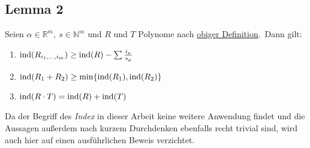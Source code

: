     \subsection{Lemma 2}
        \label{subsec:lemma2}
        Seien $\alpha \in \mathbb{R}^m,\ s \in \mathbb{N}^m$ und $R$ und $T$ Polynome nach \hyperref
        [subsubsec:def-poly]{obiger Definition}.\ Dann gilt:
        \begin{enumerate}
            \item $\operatorname{ind}(R_{i_1, \dots, i_m}) \geq \operatorname{ind}(R) - \sum \frac{i_\mu}{s_\mu}$
            \item $\operatorname{ind}(R_1 + R_2) \geq \min \{ \operatorname{ind}(R_1), \operatorname{ind}(R_2) \}$
            \item $\operatorname{ind}(R \cdot T) = \operatorname{ind}(R) +\operatorname{ind}(T)$
        \end{enumerate}
        \textrm{Da der Begriff des \emph{Index} in dieser Arbeit keine weitere Anwendung findet und die Aussagen
        außerdem nach kurzem Durchdenken ebenfalls recht trivial sind, wird auch hier auf einen ausführlichen Beweis
        verzichtet.}

    
